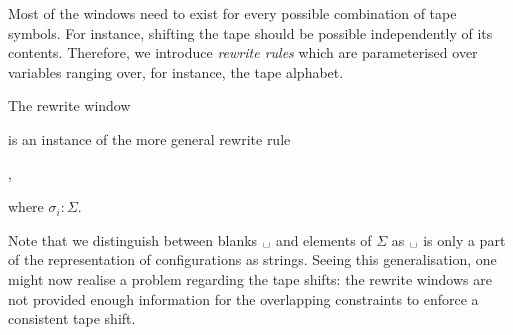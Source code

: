 Most of the windows need to exist for every possible combination of tape symbols. For instance, shifting the tape should be possible independently of its contents. Therefore, we introduce \emph{rewrite rules} which are parameterised over variables ranging over, for instance, the tape alphabet.
\begin{example}
  The rewrite window
  \begin{center}
  \end{center}
  is an instance of the more general rewrite rule
  \begin{center}
    ,
  \end{center}
  where $\sigma_i : \Sigma$. 
\end{example}
Note that we distinguish between blanks $\blank$ and elements of $\Sigma$ as $\blank$ is only a part of the representation of configurations as strings.
Seeing this generalisation, one might now realise a problem regarding the tape shifts: the rewrite windows are not provided enough information for the overlapping constraints to enforce a consistent tape shift.
